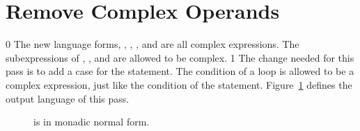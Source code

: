 \documentclass[7x10]{TimesAPriori_MIT}%
\newcommand{\gray}[1]{{\color{gray} #1}}
\def\racketEd{0}
\def\pythonEd{1}
\def\edition{1}
\begin{document}
\section{Remove Complex Operands}
\label{sec:rco-loop}

{\if\edition\racketEd
%
The new language forms, , , , and
 are all complex expressions. The subexpressions of
, , and  are allowed to be complex.
%
\fi}
{\if\edition\pythonEd
%
The change needed for this pass is to add a case for the 
statement. The condition of a  loop is allowed to be a
complex expression, just like the condition of the 
statement.
%
\fi}  
%
Figure~\ref{fig:Rwhile-anf-syntax} defines the output language
\LangLoopANF{} of this pass.

\begin{figure}[tp]
\centering
\fbox{
\begin{minipage}{0.96\textwidth}
\small
{\if\edition\racketEd    
\[
\begin{array}{rcl}
\Atm &::=& \gray{ \INT{\Int} \MID \VAR{\Var} \MID \BOOL{\itm{bool}} } \MID \VOID{} \\
\Exp &::=& \ldots \MID \gray{ \LET{\Var}{\Exp}{\Exp} } \\
     &\MID& \GETBANG{\Var}
      \MID \SETBANG{\Var}{\Exp} \\
     &\MID& \BEGIN{\LP\Exp\ldots\RP}{\Exp}
      \MID \WHILE{\Exp}{\Exp} \\
\Def &::=& \gray{ \FUNDEF{\Var}{([\Var \code{:} \Type]\ldots)}{\Type}{\code{'()}}{\Exp} }\\
\LangLoopANF  &::=& \gray{ \PROGRAMDEFS{\code{'()}}{\Def} }
\end{array}
\]
\fi}
{\if\edition\pythonEd
\[
\begin{array}{rcl}
\Atm &::=& \INT{\Int} \MID \VAR{\Var} \MID \BOOL{\itm{bool}}\\
\Exp &::=& \Atm \MID \READ{} \\
  &\MID& \BINOP{\itm{binaryop}}{\Atm}{\Atm} \MID \UNIOP{\key{unaryop}}{\Atm} \\
  &\MID& \CMP{\Atm}{\itm{cmp}}{\Atm} \MID \IF{\Exp}{\Exp}{\Exp} \\
\Stmt{} &::=& \PRINT{\Atm} \MID \EXPR{\Exp} \\
  &\MID& \ASSIGN{\VAR{\Var}}{\Exp} \MID \IFSTMT{\Exp}{\Stmt^{+}}{\Stmt^{+}}\\
  &\MID& \WHILESTMT{\Exp}{\Stmt^{+}} \\
\LangLoopANF  &::=& \PROGRAM{\code{()}}{\Stmt^{*}}
\end{array}
\]
\fi}
\end{minipage}
}
\caption{\LangLoopANF{} is \LangLoop{} in monadic normal form.}
\label{fig:Rwhile-anf-syntax}
\end{figure}
\end{document}
